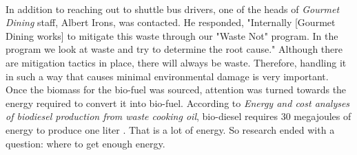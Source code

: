 \documentclass[man]{apa7}
\begin{document}
	\\
	In addition to reaching out to shuttle bus drivers, one of the heads of \textit{Gourmet Dining} staff, Albert Irons, was contacted. He responded, "Internally [Gourmet Dining works] to mitigate this waste through our "Waste Not" program.  In the program we look at waste and try to determine the root cause." Although there are mitigation tactics in place, there will always be waste. Therefore, handling it in such a way that causes minimal environmental damage is very important.
	\\
	Once the biomass for the bio-fuel was sourced, attention was turned towards the energy required to convert it into bio-fuel. According to \textit{Energy and cost analyses of biodiesel production from waste cooking oil}, bio-diesel requires 30 megajoules of energy to produce one liter \citep{Ahmad2014}. That is a lot of energy. So research ended with a question: where to get enough energy.
\end{document}

